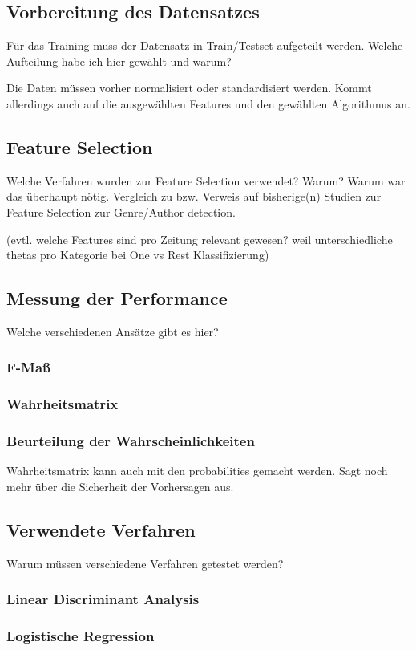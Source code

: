 \subsection{Vorbereitung des Datensatzes}
Für das Training muss der Datensatz in Train/Testset aufgeteilt werden. Welche Aufteilung habe ich hier gewählt und warum?

Die Daten müssen vorher normalisiert oder standardisiert werden.
Kommt allerdings auch auf die ausgewählten Features und den gewählten Algorithmus an.
\subsection{Feature Selection}
Welche Verfahren wurden zur Feature Selection verwendet? Warum? Warum war das überhaupt nötig. Vergleich zu bzw. Verweis auf bisherige(n) Studien zur Feature Selection zur Genre/Author detection.

(evtl. welche Features sind pro Zeitung relevant gewesen? weil unterschiedliche thetas pro Kategorie bei One vs Rest Klassifizierung)
\subsection{Messung der Performance}
Welche verschiedenen Ansätze gibt es hier?
\subsubsection*{F-Maß}
\subsubsection*{Wahrheitsmatrix}
\subsubsection*{Beurteilung der Wahrscheinlichkeiten}
Wahrheitsmatrix kann auch mit den probabilities gemacht werden. Sagt noch mehr über die Sicherheit der Vorhersagen aus.
\subsection{Verwendete Verfahren}
Warum müssen verschiedene Verfahren getestet werden?
\subsubsection*{Linear Discriminant Analysis}
\subsubsection*{Logistische Regression}
